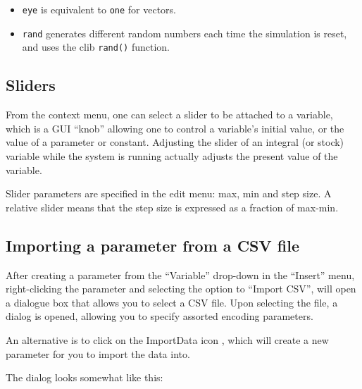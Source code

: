 \begin{itemize}
\item \verb+eye+ is equivalent to \verb+one+ for vectors.
\item \verb+rand+ generates different random numbers each time the
  simulation is reset, and uses the clib \verb+rand()+ function.
\end{itemize}


\subsection{Sliders}

From the context menu, one can select a slider to be attached to a
variable, which is a GUI ``knob'' allowing one to control a variable's
initial value, or the value of a parameter or constant. Adjusting the
slider of an integral (or stock) variable while the system is running
actually adjusts the present value of the variable.

Slider parameters are specified in the edit menu: max, min and step
size. A relative slider means that the step size is expressed as a
fraction of max-min.

\subsection{Importing a parameter from a CSV file}\label{CSV import}
\label{Operation:csvImport}

After creating a parameter from the ``Variable'' drop-down in the
``Insert'' menu, right-clicking the parameter and selecting the option
to ``Import CSV'', will open a dialogue box that allows you to select
a CSV file. Upon selecting the file, a dialog is opened, allowing you
to specify assorted encoding parameters.

An alternative is to click on the ImportData icon
, which will create a new parameter for you
to import the data into.

The dialog looks somewhat like this:

\begin{center}
\end{center}


